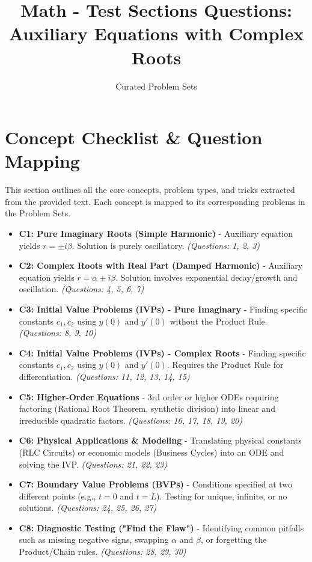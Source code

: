 \documentclass[11pt]{article}
\title{Math - Test Sections Questions: Auxiliary Equations with Complex Roots}
\author{Curated Problem Sets}
\date{}
\begin{document}
\maketitle

\tableofcontents
\newpage

\section{Concept Checklist \& Question Mapping}
This section outlines all the core concepts, problem types, and tricks extracted from the provided text. Each concept is mapped to its corresponding problems in the Problem Sets.

\begin{itemize}
    \item \textbf{C1: Pure Imaginary Roots (Simple Harmonic)} - Auxiliary equation yields $r = \pm i\beta$. Solution is purely oscillatory. \textit{(Questions: 1, 2, 3)}
    \item \textbf{C2: Complex Roots with Real Part (Damped Harmonic)} - Auxiliary equation yields $r = \alpha \pm i\beta$. Solution involves exponential decay/growth and oscillation. \textit{(Questions: 4, 5, 6, 7)}
    \item \textbf{C3: Initial Value Problems (IVPs) - Pure Imaginary} - Finding specific constants $c_1, c_2$ using $y(0)$ and $y'(0)$ without the Product Rule. \textit{(Questions: 8, 9, 10)}
    \item \textbf{C4: Initial Value Problems (IVPs) - Complex Roots} - Finding specific constants $c_1, c_2$ using $y(0)$ and $y'(0)$. Requires the Product Rule for differentiation. \textit{(Questions: 11, 12, 13, 14, 15)}
    \item \textbf{C5: Higher-Order Equations} - 3rd order or higher ODEs requiring factoring (Rational Root Theorem, synthetic division) into linear and irreducible quadratic factors. \textit{(Questions: 16, 17, 18, 19, 20)}
    \item \textbf{C6: Physical Applications \& Modeling} - Translating physical constants (RLC Circuits) or economic models (Business Cycles) into an ODE and solving the IVP. \textit{(Questions: 21, 22, 23)}
    \item \textbf{C7: Boundary Value Problems (BVPs)} - Conditions specified at two different points (e.g., $t=0$ and $t=L$). Testing for unique, infinite, or no solutions. \textit{(Questions: 24, 25, 26, 27)}
    \item \textbf{C8: Diagnostic Testing ("Find the Flaw")} - Identifying common pitfalls such as missing negative signs, swapping $\alpha$ and $\beta$, or forgetting the Product/Chain rules. \textit{(Questions: 28, 29, 30)}
\end{itemize}
\end{document}
